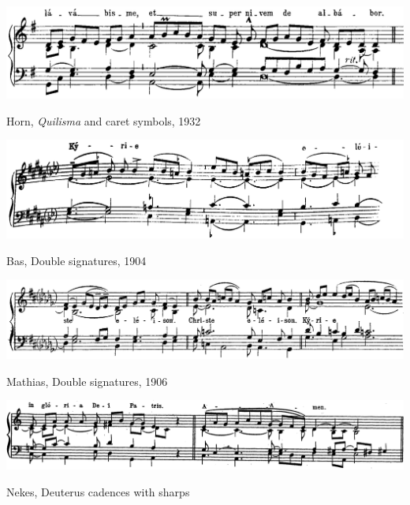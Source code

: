 \begin{landscape}

  \vspace*{\fill}

  \begin{example}
    \centering
    \includegraphics[width=.7\linewidth]{c/4/ex/horn_kyriale_1.png}
    \caption{Horn, \emph{Quilisma} and caret symbols, 1932}
    \label{mus:horn_kyriale_1}
  \end{example}

  \vspace*{\fill}

  \begin{example}
    \centering
    \includegraphics[width=.8\linewidth]{c/4/ex/bas_angelis_repertorio_15.JPG}
    \caption{Bas, Double signatures, 1904}
    \label{mus:bas_angelis_repertorio_15}
  \end{example}

  \vspace*{\fill}

\end{landscape}

\begin{landscape}

  \vspace*{\fill}

  \begin{example}
    \centering
    \includegraphics[width=.8\linewidth]{c/4/ex/mathias_transposition_44.png}
    \caption{Mathias, Double signatures, 1906}
    \label{mus:mathias_transposition_44}
  \end{example}

  \vspace*{\fill}

  \begin{example}
    \centering
    \includegraphics[width=.8\linewidth]{c/4/ex/nekes_sharps.jpg}
    \caption{Nekes, Deuterus cadences with sharps}
    \label{mus:nekes_sharps}
  \end{example}

  \vspace*{\fill}

\end{landscape}

